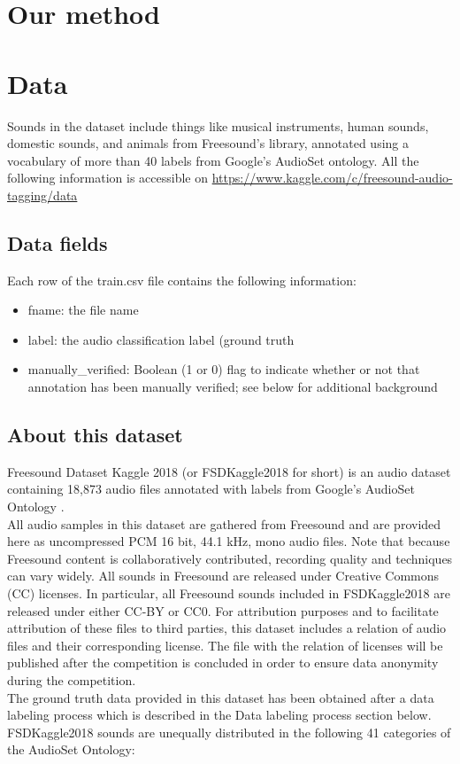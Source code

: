 \documentclass{article} %
\begin{document}
\section{Our method}

\section{Data}
	Sounds in the dataset include things like musical instruments, human sounds, domestic sounds, and animals from Freesound’s library, annotated using a vocabulary of more than 40 labels from Google’s AudioSet ontology. All the following information is accessible on \url{https://www.kaggle.com/c/freesound-audio-tagging/data}

	\subsection{Data fields}
		Each row of the train.csv file contains the following information:
			\begin{itemize}
			    \item fname: the file name
			    \item label: the audio classification label (ground truth
			    \item manually\_verified: Boolean (1 or 0) flag to indicate whether or not that annotation has been manually verified; see below for additional background
			\end{itemize}

	\subsection{About this dataset}
		Freesound Dataset Kaggle 2018 (or FSDKaggle2018 for short) is an audio dataset containing 18,873 audio files annotated with labels from Google's AudioSet Ontology \cite{cite9}.\\
		\newline
		All audio samples in this dataset are gathered from Freesound \cite{cite10} and are provided here as uncompressed PCM 16 bit, 44.1 kHz, mono audio files. Note that because Freesound content is collaboratively contributed, recording quality and techniques can vary widely. All sounds in Freesound are released under Creative Commons (CC) licenses. In particular, all Freesound sounds included in FSDKaggle2018 are released under either CC-BY or CC0. For attribution purposes and to facilitate attribution of these files to third parties, this dataset includes a relation of audio files and their corresponding license. The file with the relation of licenses will be published after the competition is concluded in order to ensure data anonymity during the competition.\\
		\newline
		The ground truth data provided in this dataset has been obtained after a data labeling process which is described in the Data labeling process section below. FSDKaggle2018 sounds are unequally distributed in the following 41 categories of the AudioSet Ontology:\\
\end{document}
